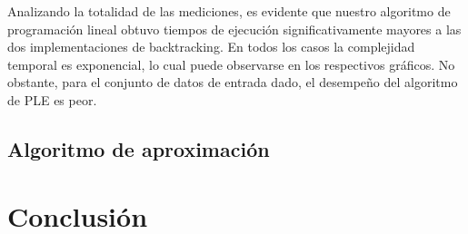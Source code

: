 \documentclass{article}
\begin{document}
Analizando la totalidad de las mediciones, es evidente que nuestro algoritmo de programación lineal obtuvo tiempos de ejecución significativamente mayores a las dos implementaciones de backtracking. En todos los casos la complejidad temporal es exponencial, lo cual puede observarse en los respectivos gráficos. No obstante, para el conjunto de datos de entrada dado, el desempeño del algoritmo de PLE es peor.

\subsection{Algoritmo de aproximación}


\section{Conclusión}
\end{document}
